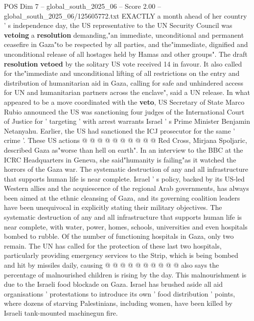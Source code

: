 \begin{textsample}{POS Dim 7 – global\_south\_2025\_06 – Score 2.00 – global\_south\_2025\_06/125605772.txt}  \label{ex:f7_pos_175}
EXACTLY a month ahead of her country ' s independence day, the US representative to the UN Security Council was \textbf{vetoing} a \textbf{resolution} demanding,"an immediate, unconditional and permanent ceasefire in Gaza"to be respected by all parties, and the"immediate, dignified and unconditional release of all hostages held by Hamas and other groups".
The draft \textbf{resolution} \textbf{vetoed} by the solitary US vote received 14 in favour.
It also called for the"immediate and unconditional lifting of all restrictions on the entry and distribution of humanitarian aid in Gaza, calling for safe and unhindered access for UN and humanitarian partners across the enclave", said a UN release.
In what appeared to be a move coordinated with the \textbf{veto}, US Secretary of State Marco Rubio announced the US was sanctioning four judges of the International Court of Justice for ' targeting ' with arrest warrants Israel ' s Prime Minister Benjamin Netanyahu.
Earlier, the US had sanctioned the ICJ prosecutor for the same ' crime '.
These US actions @ @ @ @ @ @ @ @ @ @ Red Cross, Mirjana Spoljaric, described Gaza as"worse than hell on earth".
In an interview to the BBC at the ICRC Headquarters in Geneva, she said"humanity is failing"as it watched the horrors of the Gaza war.
The systematic destruction of any and all infrastructure that supports human life is near complete.
Israel ' s policy, backed by its US-led Western allies and the acquiescence of the regional Arab governments, has always been aimed at the ethnic cleansing of Gaza, and its governing coalition leaders have been unequivocal in explicitly stating their military objectives.
The systematic destruction of any and all infrastructure that supports human life is near complete, with water, power, homes, schools, universities and even hospitals bombed to rubble.
Of the number of functioning hospitals in Gaza, only two remain.
The UN has called for the protection of these last two hospitals, particularly providing emergency services to the Strip, which is being bombed and hit by missiles daily, causing @ @ @ @ @ @ @ @ @ @ also says the percentage of malnourished children is rising by the day.
This malnourishment is due to the Israeli food blockade on Gaza.
Israel has brushed aside all aid organisations ' protestations to introduce its own ' food distribution ' points, where dozens of starving Palestinians, including women, have been killed by Israeli tank-mounted machinegun fire.

\end{textsample}
